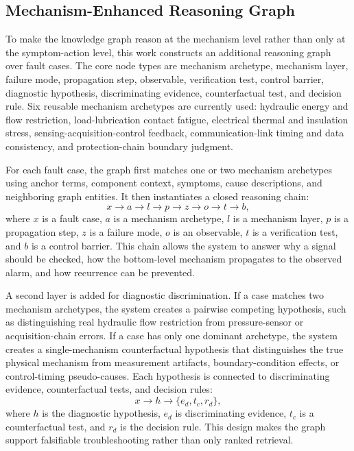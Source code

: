 \documentclass[lettersize,journal]{IEEEtran}
\begin{document}
\subsection{Mechanism-Enhanced Reasoning Graph}
To make the knowledge graph reason at the mechanism level rather than only at the symptom-action level, this work constructs an additional reasoning graph over fault cases. The core node types are mechanism archetype, mechanism layer, failure mode, propagation step, observable, verification test, control barrier, diagnostic hypothesis, discriminating evidence, counterfactual test, and decision rule. Six reusable mechanism archetypes are currently used: hydraulic energy and flow restriction, load-lubrication contact fatigue, electrical thermal and insulation stress, sensing-acquisition-control feedback, communication-link timing and data consistency, and protection-chain boundary judgment.

For each fault case, the graph first matches one or two mechanism archetypes using anchor terms, component context, symptoms, cause descriptions, and neighboring graph entities. It then instantiates a closed reasoning chain:
\begin{equation}
x \rightarrow a \rightarrow l \rightarrow p \rightarrow z \rightarrow o \rightarrow t \rightarrow b,
\end{equation}
where $x$ is a fault case, $a$ is a mechanism archetype, $l$ is a mechanism layer, $p$ is a propagation step, $z$ is a failure mode, $o$ is an observable, $t$ is a verification test, and $b$ is a control barrier. This chain allows the system to answer why a signal should be checked, how the bottom-level mechanism propagates to the observed alarm, and how recurrence can be prevented.

A second layer is added for diagnostic discrimination. If a case matches two mechanism archetypes, the system creates a pairwise competing hypothesis, such as distinguishing real hydraulic flow restriction from pressure-sensor or acquisition-chain errors. If a case has only one dominant archetype, the system creates a single-mechanism counterfactual hypothesis that distinguishes the true physical mechanism from measurement artifacts, boundary-condition effects, or control-timing pseudo-causes. Each hypothesis is connected to discriminating evidence, counterfactual tests, and decision rules:
\begin{equation}
x \rightarrow h \rightarrow \{e_d,t_c,r_d\},
\end{equation}
where $h$ is the diagnostic hypothesis, $e_d$ is discriminating evidence, $t_c$ is a counterfactual test, and $r_d$ is the decision rule. This design makes the graph support falsifiable troubleshooting rather than only ranked retrieval.
\end{document}
